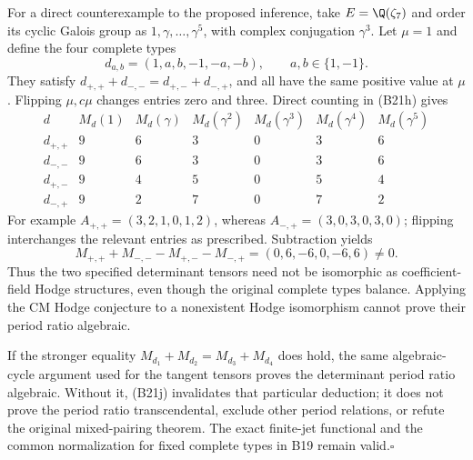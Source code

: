 For a direct counterexample to the proposed inference, take
$E=\Q(\zeta_7)$ and order its cyclic Galois group as
$1,\gamma,\ldots,\gamma^5$, with complex conjugation
$\gamma^3$.  Let $\mu=1$ and define the four complete types
\[
 d_{a,b}=(1,a,b,-1,-a,-b),\qquad a,b\in\{1,-1\}.
\]
They satisfy $d_{+,+}+d_{-,-}=d_{+,-}+d_{-,+}$, and all
have the same positive value at $\mu$.
Flipping $\mu,c\mu$ changes entries zero and three.
Direct counting in (B21h) gives
\[
\begin{array}{c|rrrrrr}
 d&M_d(1)&M_d(\gamma)&M_d(\gamma^2)&M_d(\gamma^3)
       &M_d(\gamma^4)&M_d(\gamma^5)\\\hline
 d_{+,+}&9&6&3&0&3&6\\
 d_{-,-}&9&6&3&0&3&6\\
 d_{+,-}&9&4&5&0&5&4\\
 d_{-,+}&9&2&7&0&7&2
\end{array}
\]
For example $A_{+,+}=(3,2,1,0,1,2)$, whereas
$A_{-,+}=(3,0,3,0,3,0)$; flipping interchanges the relevant
entries as prescribed.  Subtraction yields
\[
 M_{+,+}+M_{-,-}-M_{+,-}-M_{-,+}
                         =(0,6,-6,0,-6,6)\ne0.
 \tag{B21j}
\]
Thus the two specified determinant tensors need not be
isomorphic as coefficient-field Hodge structures, even though
the original complete types balance.  Applying the CM Hodge
conjecture to a nonexistent Hodge isomorphism cannot prove
their period ratio algebraic.

If the stronger equality $M_{d_1}+M_{d_2}=M_{d_3}+M_{d_4}$
does hold, the same algebraic-cycle argument used for the
tangent tensors proves the determinant period ratio algebraic.
Without it, (B21j) invalidates that particular deduction; it
does not prove the period ratio transcendental, exclude other
period relations, or refute the original mixed-pairing theorem.
The exact finite-jet functional and the common normalization
for fixed complete types in B19 remain valid.\hfill$\square$
